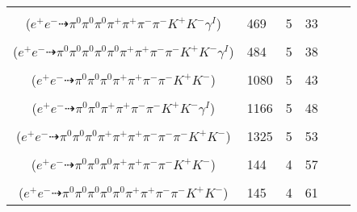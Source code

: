 \documentclass[landscape]{article}
\newcounter{rownumbers}
\newcommand\rn{\stepcounter{rownumbers}\arabic{rownumbers}}
\newcommand{\EOL}{\\} %
\newcommand{\topoTags}[1]{#1} %
\begin{document}
\begin{longtable}{clcccc}
\rn & \makecell[l]{ $ 
e^{+} e^{-} \rightarrow \pi^{0} \pi^{0} \pi^{0} \rho^{0} \pi^{+} \pi^{-} K^{+} K^{-} \gamma^{I} ,
\rho^{0} \rightarrow \pi^{+} \pi^{-} 
$ \\ ($
e^{+} e^{-} \dashrightarrow \pi^{0} \pi^{0} \pi^{0} \pi^{+} \pi^{+} \pi^{-} \pi^{-} K^{+} K^{-} \gamma^{I} 
$) } & \topoTags{469 & }5 & 33 \EOL

\rn & \makecell[l]{ $ 
e^{+} e^{-} \rightarrow \pi^{0} \pi^{0} \pi^{0} \pi^{-} \rho^{+} \omega K^{+} K^{-} \gamma^{I} ,
\rho^{+} \rightarrow \pi^{0} \pi^{+} ,
\omega \rightarrow \pi^{0} \pi^{+} \pi^{-} 
$ \\ ($
e^{+} e^{-} \dashrightarrow \pi^{0} \pi^{0} \pi^{0} \pi^{0} \pi^{0} \pi^{+} \pi^{+} \pi^{-} \pi^{-} K^{+} K^{-} \gamma^{I} 
$) } & \topoTags{484 & }5 & 38 \EOL

\rn & \makecell[l]{ $ 
e^{+} e^{-} \rightarrow \pi^{0} \pi^{0} \pi^{+} \pi^{+} \pi^{-} \rho^{-} K^{+} K^{-} ,
\rho^{-} \rightarrow \pi^{0} \pi^{-} 
$ \\ ($
e^{+} e^{-} \dashrightarrow \pi^{0} \pi^{0} \pi^{0} \pi^{+} \pi^{+} \pi^{-} \pi^{-} K^{+} K^{-} 
$) } & \topoTags{1080 & }5 & 43 \EOL

\rn & \makecell[l]{ $ 
e^{+} e^{-} \rightarrow \pi^{0} \pi^{0} \pi^{+} \pi^{+} \pi^{-} \pi^{-} K^{+} K^{-} \gamma^{I} 
$ \\ ($
e^{+} e^{-} \dashrightarrow \pi^{0} \pi^{0} \pi^{+} \pi^{+} \pi^{-} \pi^{-} K^{+} K^{-} \gamma^{I} 
$) } & \topoTags{1166 & }5 & 48 \EOL

\rn & \makecell[l]{ $ 
e^{+} e^{-} \rightarrow \pi^{0} \rho^{0} \pi^{+} \pi^{-} \rho^{+} \rho^{-} K^{+} K^{-} ,
\rho^{0} \rightarrow \pi^{+} \pi^{-} ,
\rho^{+} \rightarrow \pi^{0} \pi^{+} ,
\rho^{-} \rightarrow \pi^{0} \pi^{-} 
$ \\ ($
e^{+} e^{-} \dashrightarrow \pi^{0} \pi^{0} \pi^{0} \pi^{+} \pi^{+} \pi^{+} \pi^{-} \pi^{-} \pi^{-} K^{+} K^{-} 
$) } & \topoTags{1325 & }5 & 53 \EOL

\rn & \makecell[l]{ $ 
e^{+} e^{-} \rightarrow \pi^{0} \pi^{0} \pi^{0} \pi^{+} \pi^{+} \pi^{-} \pi^{-} K^{+} K^{-} 
$ \\ ($
e^{+} e^{-} \dashrightarrow \pi^{0} \pi^{0} \pi^{0} \pi^{+} \pi^{+} \pi^{-} \pi^{-} K^{+} K^{-} 
$) } & \topoTags{144 & }4 & 57 \EOL

\rn & \makecell[l]{ $ 
e^{+} e^{-} \rightarrow \pi^{0} \pi^{0} \pi^{0} \pi^{-} \rho^{+} \omega K^{+} K^{-} ,
\rho^{+} \rightarrow \pi^{0} \pi^{+} ,
\omega \rightarrow \pi^{0} \pi^{+} \pi^{-} 
$ \\ ($
e^{+} e^{-} \dashrightarrow \pi^{0} \pi^{0} \pi^{0} \pi^{0} \pi^{0} \pi^{+} \pi^{+} \pi^{-} \pi^{-} K^{+} K^{-} 
$) } & \topoTags{145 & }4 & 61 \EOL


\end{longtable}
\end{document}
